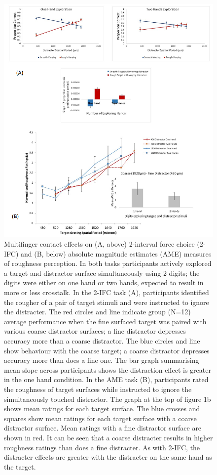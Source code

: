 \begin{figure}
  \centering
  \includegraphics[width=.7\textwidth]{Roberta/Figures/Figure1.png}
  \caption{Multifinger contact effects on (A, above) 2-interval force choice (2-IFC) and (B, below) absolute magnitude estimates (AME) measures of roughness perception. In both tasks participants actively explored a target and distractor surface simultaneously using 2 digits; the digits were either on one hand or two hands, expected to result in more or less crosstalk. In the 2-IFC task (A), participants identified the rougher of a pair of target stimuli and were instructed to ignore the distracter. The red circles and line indicate group (N=12) average performance when the fine surfaced target was paired with various coarse distractor surfaces; a fine distractor depresses accuracy more than a coarse distractor. The blue circles and line show behaviour with the coarse target; a coarse distractor depresses accuracy more than does a fine one. The bar graph summarising mean slope across participants shows the distraction effect is greater in the one hand condition. 
In the AME task (B), participants rated the roughness of target surfaces while instructed to ignore the simultaneously touched distractor. The graph at the top of figure 1b shows mean ratings for each target surface. The blue crosses and squares show mean ratings for each target surface with a coarse distractor surface. Mean ratings with a fine distractor surface are shown in red. It can be seen that a coarse distracter results in higher roughness ratings than does a fine distracter. As with 2-IFC, the distracter effects are greater with the distracter on the same hand as the target.}
  \label{Multifingercontacts}
\end{figure}

